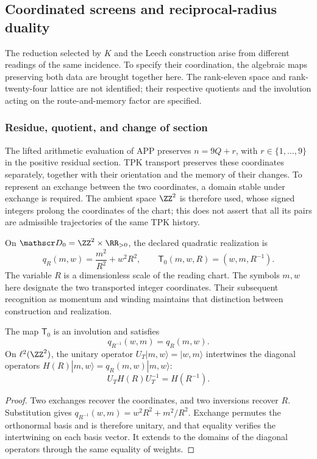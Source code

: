 \subsection{Coordinated screens and reciprocal-radius duality}
\label{exc:pantallas-dualidad}

The reduction selected by \(K\) and the Leech construction
arise from different readings of the same incidence. To specify
their coordination, the algebraic maps preserving
both data are brought together here. The rank-eleven space and rank-twenty-four lattice
are not identified; their respective quotients and the
involution acting on the route-and-memory factor are specified.

\subsubsection{Residue, quotient, and change of section}

The lifted arithmetic evaluation of APP preserves
\(n=9Q+r\), with \(r\in\{1,\ldots,9\}\) in the positive
residual section. TPK transport preserves these coordinates
separately, together with their orientation and the memory of their changes. To
represent an exchange between the two coordinates, a domain stable
under exchange is required. The ambient space
\(\ZZ^2\) is therefore used, whose signed integers prolong the coordinates of
the chart; this does not assert that all its pairs are admissible
trajectories of the same TPK history.

On \(\mathscr D_0=\ZZ^2\times\RR_{>0}\), the declared quadratic
realization is
\begin{equation}
 q_R(m,w)=\frac{m^2}{R^2}+w^2R^2,
 \qquad \mathsf T_0(m,w,R)=(w,m,R^{-1}).
 \label{eq:dualidad-normalizada-k}
\end{equation}
The variable \(R\) is a dimensionless scale of the reading chart.
The symbols \(m,w\) here designate the two transported integer
coordinates. Their subsequent recognition as momentum and winding
maintains that distinction between construction and realization.

\begin{proposition}
\label{prop:dualidad-radios-k}
The map \(\mathsf T_0\) is an involution and satisfies
\[
 q_{R^{-1}}(w,m)=q_R(m,w).
\]
On \(\ell^2(\ZZ^2)\), the unitary operator
\(U_T|m,w\rangle=|w,m\rangle\) intertwines the diagonal
operators \(H(R)|m,w\rangle=q_R(m,w)|m,w\rangle\):
\[
 U_TH(R)U_T^{-1}=H(R^{-1}).
\]
\end{proposition}
\begin{proof}
Two exchanges recover the coordinates, and two inversions recover
\(R\). Substitution gives
\(q_{R^{-1}}(w,m)=w^2R^2+m^2/R^2\). Exchange permutes
the orthonormal basis and is therefore unitary, and that equality verifies the
intertwining on each basis vector. It extends to the
domains of the diagonal operators through the same equality of weights.
\end{proof}

